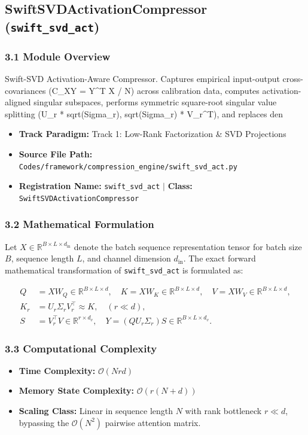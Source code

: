 \subsection{SwiftSVDActivationCompressor (\texttt{swift\_svd\_act})}
\label{sec:app_module_swift\_svd\_act}

\subsubsection*{3.1 Module Overview}
Swift-SVD Activation-Aware Compressor.  Captures empirical input-output cross-covariances (C\_XY = Y^T X / N) across calibration data, computes activation-aligned singular subspaces, performs symmetric square-root singular value splitting (U\_r * sqrt(Sigma\_r), sqrt(Sigma\_r) * V\_r^T), and replaces den
\begin{itemize}
    \item \textbf{Track Paradigm:} Track 1: Low-Rank Factorization & SVD Projections
    \item \textbf{Source File Path:} \texttt{Codes/framework/compression\_engine/swift\_svd\_act.py}
    \item \textbf{Registration Name:} \texttt{swift\_svd\_act} $\mid$ \textbf{Class:} \texttt{SwiftSVDActivationCompressor}
\end{itemize}

\subsubsection*{3.2 Mathematical Formulation}
Let $X \in \mathbb{R}^{B \times L \times d_{\text{in}}}$ denote the batch sequence representation tensor for batch size $B$, sequence length $L$, and channel dimension $d_{\text{in}}$. The exact forward mathematical transformation of \texttt{swift\_svd\_act} is formulated as:

\begin{align}
Q &= X W_Q \in \mathbb{R}^{B \times L \times d}, \quad K = X W_K \in \mathbb{R}^{B \times L \times d}, \quad V = X W_V \in \mathbb{R}^{B \times L \times d}, \\
K_r &= U_r \Sigma_r V_r^\top \approx K, \quad (r \ll d), \\
S &= V_r^\top V \in \mathbb{R}^{r \times d_v}, \quad Y = (Q U_r \Sigma_r) S \in \mathbb{R}^{B \times L \times d_v}.
\end{align}


\subsubsection*{3.3 Computational Complexity}
\begin{itemize}
    \item \textbf{Time Complexity:} $\mathcal{O}(N r d)$
    \item \textbf{Memory State Complexity:} $\mathcal{O}(r(N + d))$
    \item \textbf{Scaling Class:} Linear in sequence length $N$ with rank bottleneck $r \ll d$, bypassing the $\mathcal{O}(N^2)$ pairwise attention matrix.
\end{itemize}

